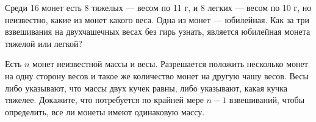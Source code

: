 \newpage

\centerline{\Huge \bf}

Среди 16 монет есть 8 тяжелых — весом по 11 г, и 8 легких — весом по 10 г, но неизвестно, какие из монет какого веса. Одна из монет — юбилейная. Как за три взвешивания на двухчашечных весах без гирь узнать, является юбилейная монета тяжелой или легкой?

Есть $n$ монет неизвестной массы и весы. Разрешается положить несколько монет на одну сторону весов и такое же количество монет на другую чашу весов. Весы либо указывают, что массы двух кучек равны, либо указывают, какая кучка тяжелее. Докажите, что потребуется по крайней мере $n - 1$ взвешиваний, чтобы определить, все ли монеты имеют одинаковую массу.